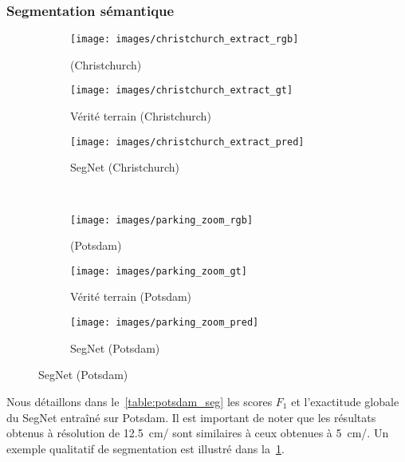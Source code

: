 \subsubsection{Segmentation sémantique}
\begin{figure}[t]
	\centering
	\begin{subfigure}{0.3\textwidth}
    	\texttt{[image: images/christchurch\_extract\_rgb]}
      \caption*{ (Christchurch)}
    \end{subfigure}
    \begin{subfigure}{0.3\textwidth}
    	\texttt{[image: images/christchurch\_extract\_gt]}
      \caption*{Vérité terrain (Christchurch)}
    \end{subfigure}
    \begin{subfigure}{0.3\textwidth}
    	\texttt{[image: images/christchurch\_extract\_pred]}
      \caption*{SegNet (Christchurch)}
    \end{subfigure}\\
    	\begin{subfigure}{0.3\textwidth}
    	\texttt{[image: images/parking\_zoom\_rgb]}
        \caption*{ (Potsdam)}
    \end{subfigure}
    \begin{subfigure}{0.3\textwidth}
    	\texttt{[image: images/parking\_zoom\_gt]}
        \caption*{Vérité terrain (Potsdam)}
    \end{subfigure}
    \begin{subfigure}{0.3\textwidth}
    	\texttt{[image: images/parking\_zoom\_pred]}
        \caption*{SegNet (Potsdam)}
    \end{subfigure}

    \label{fig:segmentations}
\end{figure}

Nous détaillons dans le~\cref{table:potsdam_seg} les scores $F_1$ et l'exactitude globale du SegNet entraîné sur Potsdam. Il est important de noter que les résultats obtenus à résolution de \SI{12,5}{\centi\meter/\px} sont similaires à ceux obtenues à \SI{5}{\centi\meter/\px}. Un exemple qualitatif de segmentation est illustré dans la~\cref{fig:segmentations}.

